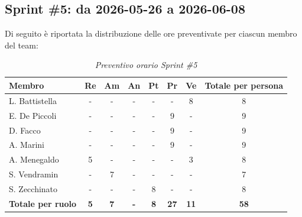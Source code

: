 \documentclass[a4paper, 10pt, colorlinks=true, linkcolor=black, urlcolor=blue, citecolor=blue, hidelinks]{article}
\renewcommand{\arraystretch}{1.2}
\begin{document}
\subsection{Sprint \#5: da 2026-05-26 a 2026-06-08}
Di seguito è riportata la distribuzione delle ore preventivate per ciascun membro del team:

\begin{table}[H]
    \centering
    \renewcommand{\arraystretch}{1.4}
    \begin{tabular}{|l|c|c|c|c|c|c|c|}
        \hline
        \rowcolor{bluBitless!15}
        \textbf{Membro} & \textbf{Re} & \textbf{Am} & \textbf{An} & \textbf{Pt} & \textbf{Pr} & \textbf{Ve} & \textbf{Totale per persona} \\
        \hline
        L. Battistella & - & - & - & - & - & 8 & 8 \\ \hline
        E. De Piccoli & - & - & - & - & 9 & - & 9 \\ \hline
        D. Facco & - & - & - & - & 9 & - & 9 \\ \hline
        A. Marini & - & - & - & - & 9 & - & 9 \\ \hline
        A. Menegaldo & 5 & - & - & - & - & 3 & 8 \\ \hline
        S. Vendramin & - & 7 & - & - & - & - & 7 \\ \hline
        S. Zecchinato & - & - & - & 8 & - & - & 8 \\ \hline
        \rowcolor{bluBitless!8}
        \textbf{Totale per ruolo} & \textbf{5} & \textbf{7} & \textbf{-} & \textbf{8} & \textbf{27} & \textbf{11} & \textbf{58} \\
        \hline
    \end{tabular}
    \caption{\textit{Preventivo orario Sprint \#5}}
\end{table}
\end{document}
